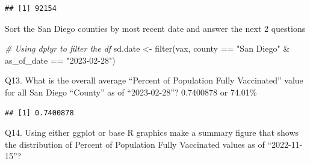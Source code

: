 \documentclass[
]{article}
\newenvironment{Shaded}{\begin{snugshade}}{\end{snugshade}}
\newcommand{\AttributeTok}[1]{\textcolor[rgb]{0.77,0.63,0.00}{#1}}
\newcommand{\CommentTok}[1]{\textcolor[rgb]{0.56,0.35,0.01}{\textit{#1}}}
\newcommand{\DecValTok}[1]{\textcolor[rgb]{0.00,0.00,0.81}{#1}}
\newcommand{\FunctionTok}[1]{\textcolor[rgb]{0.00,0.00,0.00}{#1}}
\newcommand{\NormalTok}[1]{#1}
\newcommand{\OtherTok}[1]{\textcolor[rgb]{0.56,0.35,0.01}{#1}}
\newcommand{\SpecialCharTok}[1]{\textcolor[rgb]{0.00,0.00,0.00}{#1}}
\newcommand{\StringTok}[1]{\textcolor[rgb]{0.31,0.60,0.02}{#1}}
\begin{document}
\begin{verbatim}
## [1] 92154
\end{verbatim}

Sort the San Diego counties by most recent date and answer the next 2
questions

\begin{Shaded}
\begin{Highlighting}[]
\CommentTok{\# Using dplyr to filter the df}
\NormalTok{sd.date }\OtherTok{\textless{}{-}} \FunctionTok{filter}\NormalTok{(vax, county }\SpecialCharTok{==} \StringTok{"San Diego"} \SpecialCharTok{\&}\NormalTok{ as\_of\_date }\SpecialCharTok{==} \StringTok{"2023{-}02{-}28"}\NormalTok{)}
\end{Highlighting}
\end{Shaded}

Q13. What is the overall average ``Percent of Population Fully
Vaccinated'' value for all San Diego ``County'' as of ``2023-02-28''?
0.7400878 or 74.01\%

\begin{Shaded}
\end{Shaded}

\begin{verbatim}
## [1] 0.7400878
\end{verbatim}

Q14. Using either ggplot or base R graphics make a summary figure that
shows the distribution of Percent of Population Fully Vaccinated values
as of ``2022-11-15''?

\begin{Shaded}
\end{Shaded}
\end{document}
